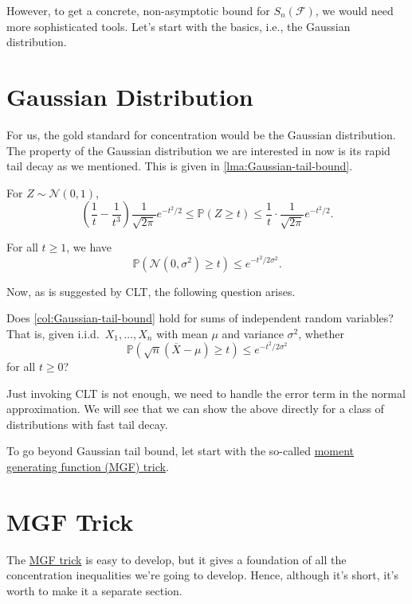 However, to get a concrete, non-asymptotic bound for \(S_n(\mathscr{F} )\), we would need more sophisticated tools. Let's start with the basics, i.e., the Gaussian distribution.

\section{Gaussian Distribution}
For us, the gold standard for concentration would be the Gaussian distribution. The property of the Gaussian distribution we are interested in now is its rapid tail decay as we mentioned. This is given in \autoref{lma:Gaussian-tail-bound}.

\begin{lemma}\label{lma:Gaussian-tail-bound}
	For \(Z \sim \mathcal{N} (0, 1)\),
	\[
		\left( \frac{1}{t} - \frac{1}{t^3} \right) \frac{1}{\sqrt{2\pi } } e^{- t^2 / 2} \leq \mathbb{P}(Z \geq t) \leq \frac{1}{t} \cdot \frac{1}{\sqrt{2\pi } } e^{- t^2 / 2}.
	\]
\end{lemma}

\begin{corollary}\label{col:Gaussian-tail-bound}
	For all \(t \geq 1\), we have
	\[
		\mathbb{P} (\mathcal{N} (0, \sigma ^{2} ) \geq t) \leq e^{-t^2 / 2\sigma ^{2} }.
	\]
\end{corollary}

Now, as is suggested by CLT, the following question arises.

\begin{problem*}
	Does \autoref{col:Gaussian-tail-bound} hold for sums of independent random variables? That is, given i.i.d.\ \(X_1, \dots , X_n\) with mean \(\mu \) and variance \(\sigma ^{2} \), whether
	\[
		\mathbb{P} (\sqrt{n}(\overline{X} - \mu ) \geq t )\leq e^{-t^2 / 2 \sigma ^{2} }
	\]
	for all \(t \geq 0\)?
\end{problem*}
\begin{answer}
	Just invoking CLT is not enough, we need to handle the error term in the normal approximation. We will see that we can show the above directly for a class of distributions with fast tail decay.
\end{answer}

To go beyond Gaussian tail bound, let start with the so-called \hyperref[lma:MGF-trick]{moment generating function (MGF) trick}.

\section{MGF Trick}
The \hyperref[lma:MGF-trick]{MGF trick} is easy to develop, but it gives a foundation of all the concentration inequalities we're going to develop. Hence, although it's short, it's worth to make it a separate section.


